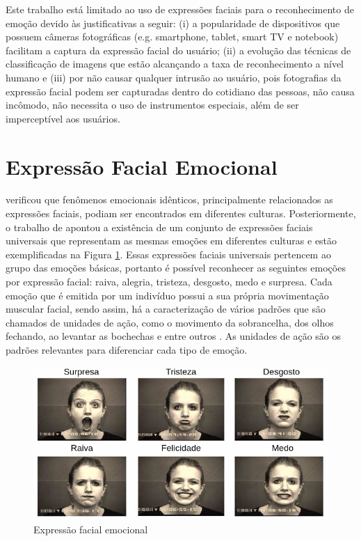 Este trabalho está limitado ao uso de expressões faciais para o reconhecimento de emoção devido às justificativas a seguir: (i) a popularidade de dispositivos que possuem câmeras fotográficas (e.g. smartphone, tablet, smart TV e notebook) facilitam a captura da expressão facial do usuário; (ii) a evolução das técnicas de classificação de imagens que estão alcançando a taxa de reconhecimento a nível humano e (iii) por não causar qualquer intrusão ao usuário, pois fotografias da expressão facial podem ser capturadas dentro do cotidiano das pessoas, não causa incômodo, não necessita o uso de instrumentos especiais, além de ser imperceptível aos usuários.

\section{Expressão Facial Emocional}\label{sec:expfacia}
\cite{darwin1965expression} verificou que fenômenos emocionais idênticos, principalmente relacionados as expressões faciais, podiam ser encontrados em diferentes culturas. Posteriormente, o trabalho de \cite{ekman1994} apontou a existência de um conjunto de expressões faciais universais que representam as mesmas emoções em diferentes culturas e estão exemplificadas na Figura \ref{fig:facesbasicas}. Essas expressões faciais universais pertencem ao grupo das emoções básicas, portanto é possível reconhecer as seguintes emoções por expressão facial: raiva, alegria, tristeza, desgosto, medo e surpresa. Cada emoção que é emitida por um indivíduo possui a sua própria movimentação muscular facial, sendo assim, há a caracterização de vários padrões que são chamados de unidades de ação, como o movimento da sobrancelha, dos olhos fechando, ao levantar as bochechas e entre outros \citep{ekman1977facial}. As unidades de ação são os padrões relevantes para diferenciar cada tipo de emoção. 

\begin{figure}
\centering
\includegraphics[scale=0.7]{figuras/facesbasicas.png}
\caption{Expressão facial emocional}
\label{fig:facesbasicas}
\end{figure}

